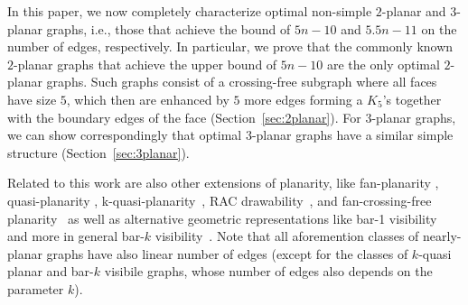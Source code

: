In this paper, we now completely characterize optimal non-simple $2$-planar and $3$-planar graphs, i.e., those that achieve the bound of $5n-10$ and $5.5n-11$ on the number of edges, respectively. In particular, we prove that the commonly known $2$-planar graphs that achieve the upper bound of $5n-10$ are the only optimal $2$-planar graphs. Such graphs consist of a crossing-free subgraph where all faces have size $5$, which then are enhanced by $5$ more edges forming a $K_5$'s together with the boundary edges of the face (Section~\ref{sec:2planar}). For $3$-planar graphs, we can show correspondingly that optimal $3$-planar graphs have a similar simple structure (Section~\ref{sec:3planar}).

Related to this work are also other extensions of planarity, like fan-planarity \cite{KU14,DBLP:conf/gd/BekosCGHK14,DBLP:journals/tcs/BinucciGDMPST15,DBLP:conf/gd/BinucciCDGKKMT15}, quasi-planarity \cite{AAPPS97,DBLP:journals/cj/GiacomoDLMW15}, k-quasi-planarity~\cite{DBLP:conf/gd/Suk11,DBLP:journals/comgeo/SukW15}, RAC drawability~\cite{DBLP:journals/tcs/DidimoEL11,DBLP:journals/jgaa/ArgyriouBS12}, and fan-crossing-free planarity~\cite{DBLP:journals/algorithmica/CheongHKK15} 
as well as alternative geometric representations like bar-1 visibility~\cite{DBLP:conf/icaa/SultanaRRT14,DBLP:journals/jgaa/Evans0LMW14,DBLP:conf/walcom/BrandenburgEN16} and more in general bar-$k$ visibility~\cite{DBLP:journals/dm/GenesonKT14,DBLP:journals/corr/SawhneyW16}. Note that all aforemention classes of nearly-planar graphs have also linear number of edges (except for the classes of $k$-quasi planar and bar-$k$ visibile graphs, whose number of edges also depends on the parameter $k$). 

